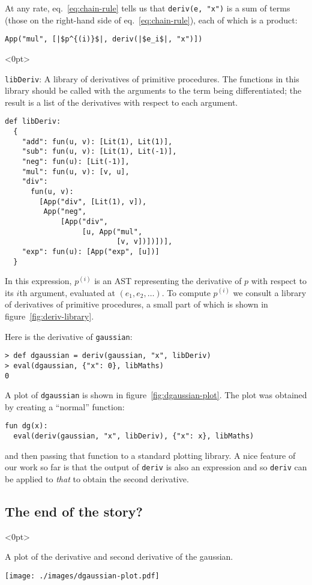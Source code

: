 \documentclass[11pt, a4paper]{article}
\newcommand{\cd}[1]{\texttt{#1}}
\begin{document}
At any rate, eq.~\eqref{eq:chain-rule} tells us that \cd{deriv(e, "x")}
is a sum of terms (those on the right-hand side of
eq.~\eqref{eq:chain-rule}), each of which is a product:
\begin{verbatim}
App("mul", [|$p^{(i)}$|, deriv(|$e_i$|, "x")])
\end{verbatim}

\begin{marginfigure}<0pt>
  \caption{\cd{libDeriv}: A library of derivatives of primitive
    procedures. The functions in this library should be called with
    the arguments to the term being differentiated; the result is a
    list of the derivatives with respect to each argument.\label{fig:deriv-library}}
  \footnotesize
\begin{verbatim}
def libDeriv:
  {
    "add": fun(u, v): [Lit(1), Lit(1)],
    "sub": fun(u, v): [Lit(1), Lit(-1)],
    "neg": fun(u): [Lit(-1)],
    "mul": fun(u, v): [v, u],
    "div": 
      fun(u, v):
        [App("div", [Lit(1), v]),
         App("neg",
             [App("div",
                  [u, App("mul",
                          [v, v])])])],
    "exp": fun(u): [App("exp", [u])]
  }
\end{verbatim}
\end{marginfigure}
In this expression, $p^{(i)}$ is an AST representing the derivative of
$p$ with respect to its $i$th argument, evaluated at
$(e_1, e_2, \dotsc)$. To compute $p^{(i)}$ we consult a library of
derivatives of primitive procedures, a small part of which is shown in
figure~\ref{fig:deriv-library}.

Here is the derivative of \cd{gaussian}:
\begin{verbatim}
> def dgaussian = deriv(gaussian, "x", libDeriv)
> eval(dgaussian, {"x": 0}, libMaths)
0
\end{verbatim}
A plot of \cd{dgaussian} is shown in figure~\ref{fig:dgaussian-plot}.
The plot was obtained by creating a ``normal'' function:
\begin{verbatim}
fun dg(x):
  eval(deriv(gaussian, "x", libDeriv), {"x": x}, libMaths)
\end{verbatim}
and then passing that function to a standard plotting library. A nice
feature of our work so far is that the output of \cd{deriv} is also
an expression and so \cd{deriv} can be applied to \emph{that} to
obtain the second derivative.

\subsection{The end of the story?}
\begin{marginfigure}<0pt>
  \caption{A plot of the derivative and second derivative of the
    gaussian.\label{fig:dgaussian-plot}}
  \centering
  \texttt{[image: ./images/dgaussian-plot.pdf]}
\end{marginfigure}
  
\end{document}
